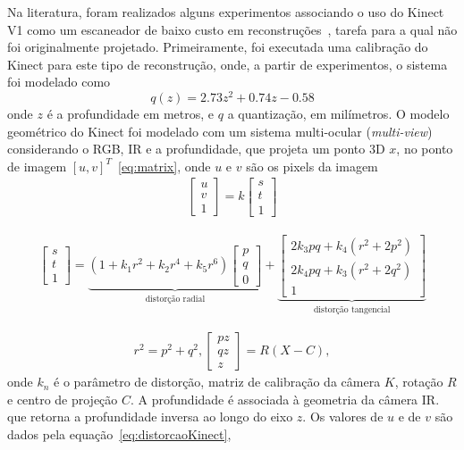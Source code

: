 Na literatura, foram realizados alguns experimentos associando o uso do Kinect V1 como um
escaneador de baixo custo em reconstruções~\cite{smisek20133d}, tarefa para a qual não foi
originalmente projetado. Primeiramente, foi executada uma calibração do
Kinect para este tipo de reconstrução, onde, a partir de experimentos, o sistema
foi modelado como
\begin{equation}
\label{eq:kinectCalibracao}
q(z)=2.73z^{2}+0.74z-0.58
\end{equation}
onde $z$ é a profundidade em metros, e $q$ a quantização, em milímetros.
O modelo geométrico do Kinect foi modelado com um sistema multi-ocular
(\emph{multi-view}) considerando o RGB, IR e a profundidade, que projeta um ponto 3D $x$, no ponto de imagem $[u,v]^T$~\ref{eq:matrix}, 
onde $u$ e $v$ são os pixels da imagem
\begin{gather} 
\label{eq:matrix}
\begin{bmatrix}
u\\
v\\
1
\end{bmatrix} 
= k
\begin{bmatrix}
s\\
t\\
1
\end{bmatrix}
\end{gather}

\begin{gather} 
\begin{bmatrix}
s\\
t\\
1
\end{bmatrix} 
= 
\underbrace{(1 + k_1r^2 + k_2r^4 + k_5r^6) 
\begin{bmatrix}
p\\
q\\
0
\end{bmatrix} }_{\text{distorção radial}} 
+
\underbrace{
\begin{bmatrix}
2k_3pq+k_4(r^2+2p^2)\\
2k_4pq+k_3(r^2+2q^2)\\
1
\end{bmatrix} }_{\text{distorção tangencial}}
\label{eq:distorcaoKinect}
\end{gather}

\begin{gather}
r^2 = p^2+q^2, 
\begin{bmatrix}
pz\\ 
qz\\ 
z
\end{bmatrix} = R(X-C),
\label{eq:relacaoKinect}
\end{gather}
onde $k_n$ é o parâmetro de distorção, matriz de calibração da câmera $K$,
rotação $R$ e centro de projeção $C$.
A profundidade é associada à geometria da câmera IR. que retorna a profundidade inversa ao longo do eixo $z$.
Os valores de $u$ e de $v$ são dados pela equação~\ref{eq:distorcaoKinect}, %

